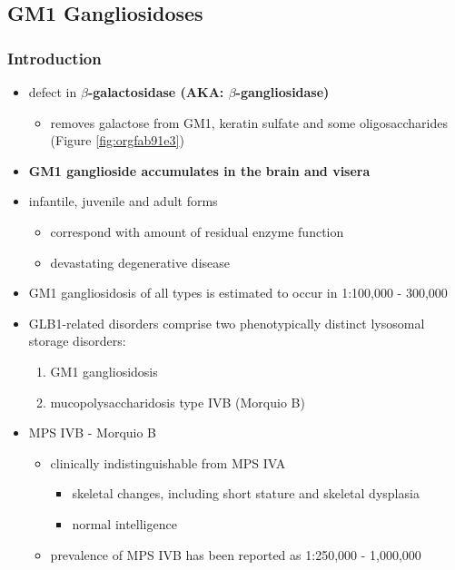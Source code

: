 \documentclass[12pt]{scrartcl}
\begin{document}
\subsection{GM1 Gangliosidoses}
\label{sec:org418ad02}
\subsubsection{Introduction}
\label{sec:org4bfc3cf}
\begin{itemize}
\item defect in \textbf{\(\beta\)-galactosidase (AKA: \(\beta\)-gangliosidase)}
\begin{itemize}
\item removes galactose from GM1, keratin sulfate and some oligosaccharides (Figure \ref{fig:orgfab91e3})
\end{itemize}
\item \textbf{GM1 ganglioside accumulates in the brain and visera}
\item infantile, juvenile and adult forms
\begin{itemize}
\item correspond with amount of residual enzyme function
\item devastating degenerative disease
\end{itemize}
\item GM1 gangliosidosis of all types is estimated to occur in 1:100,000 - 300,000
\item GLB1-related disorders comprise two phenotypically distinct lysosomal storage disorders:
\begin{enumerate}
\item GM1 gangliosidosis
\item mucopolysaccharidosis type IVB (Morquio B)
\end{enumerate}
\item MPS IVB - Morquio B
\begin{itemize}
\item clinically indistinguishable from MPS IVA 
\begin{itemize}
\item skeletal changes, including short stature and skeletal dysplasia
\item normal intelligence
\end{itemize}
\item prevalence of MPS IVB has been reported as 1:250,000 - 1,000,000
\end{itemize}
\end{itemize}
\end{document}
